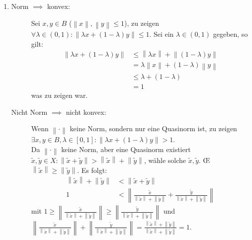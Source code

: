 \documentclass[sectionformat=aufgabe]{gadsescript}
\begin{document}
\section{}
\begin{enumerate}[label=(\alph*)]
	\item 
		\begin{description}
			\item[Norm $ \implies  $ konvex:]
				Sei $ x, y \in B $ ($ \left\| x \right\|, \left\| y \right\| \leq 1 $), zu zeigen $ \forall \lambda \in (0, 1) : \left\| \lambda x + ( 1 - \lambda) y \right\| \leq 1 $.
				Sei ein $ \lambda \in (0, 1) $ gegeben, so gilt:
				\begin{align*}
					\left\| \lambda x + ( 1 - \lambda) y \right\| &\leq \left\| \lambda x \right\| + \left\| (1 - \lambda) y \right\| \\
										      &= \lambda \left\| x \right\| + (1 - \lambda) \left\| y \right\|  \\
										      &\leq \lambda + (1 - \lambda) \\
										      &= 1
				 \end{align*}
				 was zu zeigen war.
			 \item[Nicht Norm $ \implies  $ nicht konvex:] 
				 Wenn $ \left\| \cdot  \right\|  $ keine Norm, sondern nur eine Quasinorm ist, zu zeigen $ \exists x, y \in B, \lambda \in [0, 1]: \left\| \lambda x + ( 1 - \lambda) y \right\| > 1 $.\\
				 Da $ \left\| \cdot  \right\|  $ keine Norm, aber eine Quasinorm existiert $ \tilde x, \tilde y \in X : \left\| \tilde x  + \tilde y \right\| > \left\| \tilde x \right\| + \left\| \tilde y \right\|  $, wähle solche $ \tilde x, \tilde y $.
				 \OE{} $ \left\| \tilde x \right\| \geq  \left\| \tilde y \right\|  $.
				 Es folgt:
				 \begin{align*}
					 \left\| \tilde x \right\| + \left\| \tilde y \right\| &< \left\| \tilde x + \tilde y \right\| \\
					 \tag{$ * $}\label{eq:wie labelt man richtig?}
					 1 &< \left\| \frac{ \tilde x }{ \left\| \tilde x \right\| + \left\| \tilde y \right\|  } + \frac{ \tilde y }{ \left\| \tilde x \right\| + \left\| \tilde y \right\|  }  \right\|
				 \end{align*}
				 mit $ 1 \geq  \left\| \frac{ \tilde x }{ \left\| \tilde x \right\| + \left\| \tilde y \right\|  }  \right\| \geq  \left\| \frac{ \tilde y }{ \left\| \tilde x \right\| + \left\| \tilde y \right\|  }  \right\|  $
				 und $ \left\| \frac{ \tilde x }{ \left\| \tilde x \right\| + \left\| \tilde y \right\|  }  \right\| + \left\| \frac{ \tilde y }{ \left\| \tilde x \right\| + \left\| \tilde y \right\|  }  \right\| = \frac{ \left\| \tilde x \right\| + \left\| \tilde y \right\| }{ \left\| \tilde x \right\| + \left\| \tilde y \right\| } = 1 $.\\

\end{description}
\end{enumerate}
\end{document}
